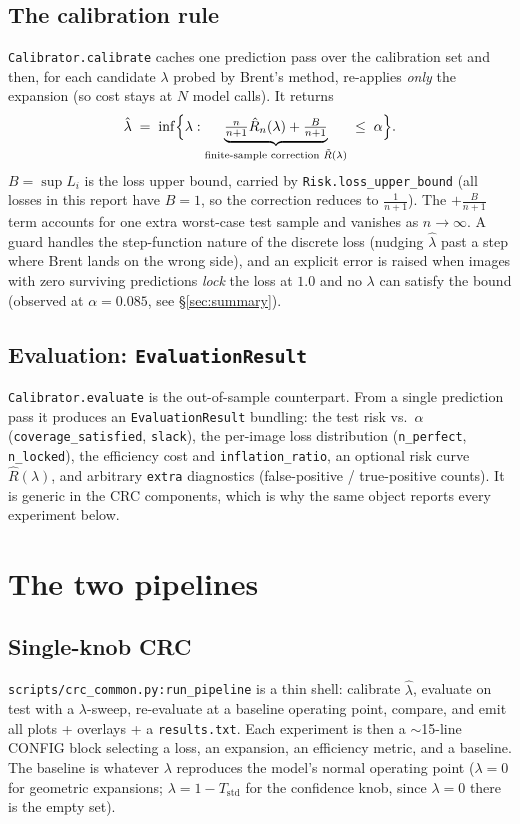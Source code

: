 \documentclass[11pt,a4paper]{article}
\newcommand{\lamhat}{\hat{\lambda}}
\newcommand{\code}[1]{\texttt{\small #1}}
\begin{document}
\subsection{The calibration rule}
\code{Calibrator.calibrate} caches one prediction pass over the calibration set
and then, for each candidate $\lambda$ probed by Brent's method, re-applies
\emph{only} the expansion (so cost stays at $N$ model calls). It returns
\begin{equation}
  \lamhat \;=\; \inf\Bigl\{\lambda :
   \underbrace{\tfrac{n}{n+1}\hat{R}_n(\lambda) + \tfrac{B}{n+1}}_{\text{finite-sample correction } \tilde R(\lambda)}
   \;\le\; \alpha \Bigr\}.
  \label{eq:crc-rule}
\end{equation}
$B = \sup L_i$ is the loss upper bound, carried by \code{Risk.loss\_upper\_bound}
(all losses in this report have $B=1$, so the correction reduces to $\tfrac{1}{n+1}$).
The $+\tfrac{B}{n+1}$ term accounts for one extra worst-case test sample and
vanishes as $n\to\infty$. A guard handles the step-function nature of the
discrete loss (nudging $\lamhat$ past a step where Brent lands on the wrong
side), and an explicit error is raised when images with zero surviving
predictions \emph{lock} the loss at $1.0$ and no $\lambda$ can satisfy the bound
(observed at $\alpha=0.085$, see \S\ref{sec:summary}).

\subsection{Evaluation: \texttt{EvaluationResult}}
\code{Calibrator.evaluate} is the out-of-sample counterpart. From a single
prediction pass it produces an \code{EvaluationResult} bundling: the test risk
vs.\ $\alpha$ (\code{coverage\_satisfied}, \code{slack}), the per-image loss
distribution (\code{n\_perfect}, \code{n\_locked}), the efficiency cost and
\code{inflation\_ratio}, an optional risk curve $\hat R(\lambda)$, and arbitrary
\code{extra} diagnostics (false-positive / true-positive counts). It is generic
in the CRC components, which is why the same object reports every experiment
below.

\section{The two pipelines}
\subsection{Single-knob CRC}
\code{scripts/crc\_common.py:run\_pipeline} is a thin shell: calibrate
$\lamhat$, evaluate on test with a $\lambda$-sweep, re-evaluate at a baseline
operating point, compare, and emit all plots + overlays + a \code{results.txt}.
Each experiment is then a $\sim$15-line CONFIG block selecting a loss, an
expansion, an efficiency metric, and a baseline. The baseline is whatever
$\lambda$ reproduces the model's normal operating point ($\lambda=0$ for
geometric expansions; $\lambda = 1-T_{\text{std}}$ for the confidence knob,
since $\lambda=0$ there is the empty set).
\end{document}
